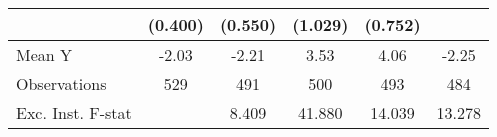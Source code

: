 {\begin{tabular}{l*{5}{c}}
            &     (0.400)         &     (0.550)         &     (1.029)         &     (0.752)         &                     \\
\midrule
Mean Y      &       -2.03         &       -2.21         &        3.53         &        4.06         &       -2.25         \\
Observations&         529         &         491         &         500         &         493         &         484         \\
Exc. Inst. F-stat&                     &       8.409         &      41.880         &      14.039         &      13.278         \\
\bottomrule
\end{tabular}
}
